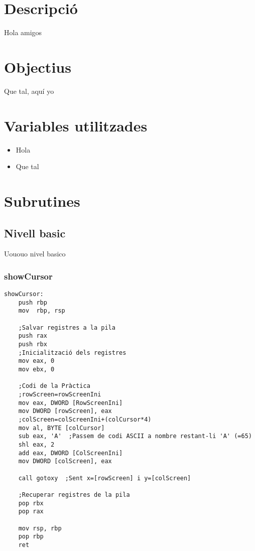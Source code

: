 \documentclass[a4paper,12pt]{article}
\begin{document}

\section{Descripció}
Hola amigos
\section{Objectius}
Que tal, aquí yo
\section{Variables utilitzades}
\begin{itemize}
    \item Hola
    \item Que tal
\end{itemize}
\section{Subrutines}
\subsection{Nivell basic}
Uououo nivel basico
\subsubsection{showCursor}
\begin{lstlisting}[firstnumber=246]
showCursor:
	push rbp
	mov  rbp, rsp

	;Salvar registres a la pila
	push rax
	push rbx
	;Inicialització dels registres
	mov eax, 0
	mov ebx, 0

	;Codi de la Pràctica
	;rowScreen=rowScreenIni
	mov eax, DWORD [RowScreenIni]
	mov DWORD [rowScreen], eax
	;colScreen=colScreenIni+(colCursor*4)
	mov al, BYTE [colCursor]
	sub eax, 'A'  ;Passem de codi ASCII a nombre restant-li 'A' (=65)
	shl eax, 2
	add eax, DWORD [ColScreenIni]
	mov DWORD [colScreen], eax

	call gotoxy  ;Sent x=[rowScreen] i y=[colScreen]

	;Recuperar registres de la pila
	pop rbx
	pop rax

	mov rsp, rbp
	pop rbp
	ret
\end{lstlisting}
\end{document}
